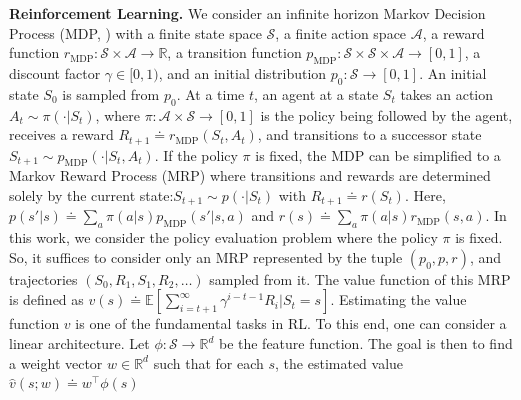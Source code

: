 \documentclass{article}
\newcommand{\fS}{\mathcal{S}}
\newcommand{\fA}{\mathcal{A}}
\newcommand{\R}{\mathbb{R}}
\newcommand{\E}{\mathbb{E}}
\newcommand{\tb}[1]{{\textbf{#1}}}
\newcommand{\mdp}{\text{MDP}}
\begin{document}
\tb{Reinforcement Learning.}
We consider an infinite horizon Markov Decision Process (MDP, \citet{puterman2014markov}) with a finite state space $\fS$,
a finite action space $\fA$,
a reward function $r_\mdp: \fS \times \fA \to \R$,
a transition function $p_\mdp: \fS \times \fS \times \fA \to [0, 1]$,
a discount factor $\gamma \in [0, 1)$,
and an initial distribution $p_0: \fS \to [0, 1]$.
An initial state $S_0$ is sampled from $p_0$.
At a time $t$,
an agent at a state $S_t$
 takes an action $A_t \sim \pi(\cdot | S_t)$,
where $\pi: \fA \times \fS \to [0, 1]$ is the policy being followed by the agent,
receives a reward $R_{t+1} \doteq r_\mdp(S_t, A_t)$,
and transitions to a successor state $S_{t+1} \sim p_\mdp(\cdot | S_t, A_t)$.
If the policy $\pi$ is fixed, the MDP can be simplified to a Markov Reward Process (MRP) where transitions and rewards are determined solely by the current state:$S_{t+1} \sim p(\cdot | S_t)$ with $R_{t+1} \doteq r(S_t)$.
Here, $p(s' | s) \doteq \sum_a \pi(a | s) p_\mdp(s'|s, a)$ and $r(s) \doteq \sum_a \pi(a|s) r_\mdp(s, a)$.
In this work,
we consider the policy evaluation problem where the policy $\pi$ is fixed.
So, it suffices to consider only
an MRP represented by the tuple $(p_0, p, r)$,
and trajectories $(S_0, R_1, S_1, R_2, \dots)$ sampled from it.
The value function of this MRP is defined as
    $
    v(s) \doteq \E\left[\sum_{i = t+1}^\infty \gamma^{i - t -1} R_i | S_t = s\right]
    $.
Estimating the value function $v$ is one of the fundamental tasks in RL.
To this end, one can consider a linear architecture.
Let $\phi: \fS \to \R^d$ be the feature function.
The goal is then to find a weight vector $w \in \R^d$ such that for each $s$, the estimated value $\hat{v}(s; w) \doteq w^\top \phi(s)$
\end{document}
